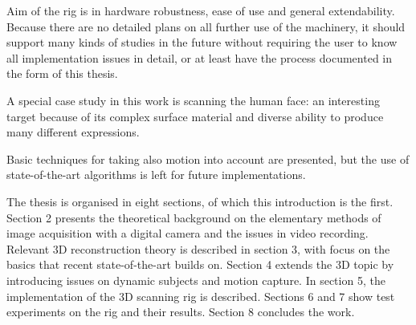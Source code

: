 
Aim of the rig is in hardware robustness, ease of use and general extendability.
Because there are no detailed plans on all further use of the machinery, it should support many kinds of studies in the future without requiring the user to know all implementation issues in detail, or at least have the process documented in the form of this thesis.

A special case study in this work is scanning the human face: an interesting target because of its complex surface material and diverse ability to produce many different expressions.

%

Basic techniques for taking also motion into account are presented, but the use of state-of-the-art algorithms is left for future implementations.

The thesis is organised in eight sections, of which this introduction is the first.
Section 2 presents the theoretical background on the elementary methods of image acquisition with a digital camera and the issues in video recording.
Relevant 3D reconstruction theory is described in section 3, with focus on the basics that recent state-of-the-art builds on.
Section 4 extends the 3D topic by introducing issues on dynamic subjects and motion capture.
In section 5, the implementation of the 3D scanning rig is described.
Sections 6 and 7 show test experiments on the rig and their results.
Section 8 concludes the work.
